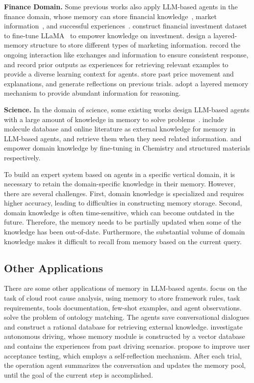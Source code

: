 \documentclass{article}
\theoremstyle{definition}
\theoremstyle{theorem}
\theoremstyle{proof}
\theoremstyle{remark}
\begin{document}
	\textbf{Finance Domain.}
	Some previous works also apply LLM-based agents in the finance domain, whose memory can store financial knowledge~\cite{investlm}, market information~\cite{tradinggpt,finmem}, and successful experiences~\cite{koa2024learning,quantagent}. \citet{investlm} construct financial investment dataset to fine-tune LLaMA~\cite{llama} to empower knowledge on investment. \citet{tradinggpt} design a layered-memory structure to store different types of marketing information. \citet{quantagent} record the ongoing interaction like exchanges and information to ensure consistent response, and record prior outputs as experiences for retrieving relevant examples to provide a diverse learning context for agents. \citet{koa2024learning} store past price movement and explanations, and generate reflections on previous trials. \citet{finmem} adopt a layered memory mechanism to provide abundant information for reasoning.
	
	\textbf{Science.}
	In the domain of science, some existing works design LLM-based agents with a large amount of knowledge in memory to solve problems~\cite{chemistx,chemdfm,matchat}. \citet{chemistx} include molecule database and online literature as external knowledge for memory in LLM-based agents, and retrieve them when they need related information. \citet{chemdfm} and \citet{matchat} empower domain knowledge by fine-tuning in Chemistry and structured materials respectively.
	
	To build an expert system based on agents in a specific vertical domain, it is necessary to retain the domain-specific knowledge in their memory. However, there are several challenges. First, domain knowledge is specialized and requires higher accuracy, leading to difficulties in constructing memory storage. Second, domain knowledge is often time-sensitive, which can become outdated in the future.
	Therefore, the memory needs to be partially updated when some of the knowledge has been out-of-date.
	Furthermore, the substantial volume of domain knowledge makes it difficult to recall from memory based on the current query.
	
	\subsection{Other Applications}
	There are some other applications of memory in LLM-based agents. \citet{rcagent} focus on the task of cloud root cause analysis, using memory to store framework rules, task requirements, tools documentation, few-shot examples, and agent observations. \citet{agent_om} solve the problem of ontology matching. The agents save conversational dialogues and construct a rational database for retrieving external knowledge. \citet{dilu} investigate autonomous driving, whose memory module is constructed by a vector database and contains the experiences from past driving scenarios. \citet{xuat} propose to improve user acceptance testing, which employs a self-reflection mechanism. After each trial, the operation agent summarizes the conversation and updates the memory pool, until the goal of the current step is accomplished. 
	
\end{document}
